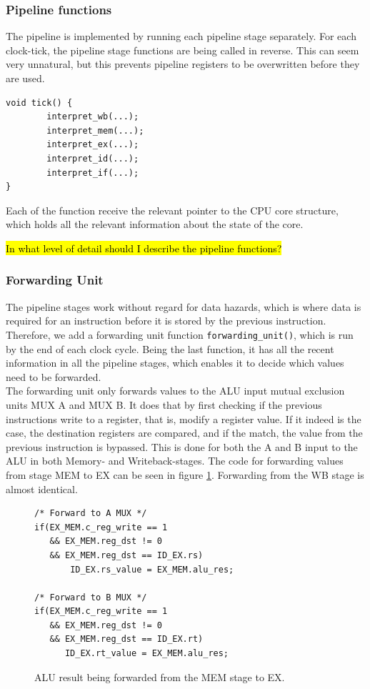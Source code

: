 \subsubsection{Pipeline functions}
The pipeline is implemented by running each pipeline stage separately. For each
clock-tick, the pipeline stage functions are being called in reverse. This can
seem very unnatural, but this prevents pipeline registers to be overwritten
before they are used.
\begin{verbatim}
void tick() {
        interpret_wb(...);
        interpret_mem(...);
        interpret_ex(...);
        interpret_id(...);
        interpret_if(...);
}
\end{verbatim}

Each of the function receive the relevant pointer to the CPU core structure,
which holds all the relevant information about the state of the core.

\hl{In what level of detail should I describe the pipeline functions?}


\subsubsection{Forwarding Unit}
The pipeline stages work without regard for data hazards, which is where data
is required for an instruction before it is stored by the previous instruction.
Therefore, we add a forwarding unit function \texttt{forwarding\_unit()}, which
is run by the end of each clock cycle. Being the last function, it has all the
recent information in all the pipeline stages, which enables it to decide which
values need to be forwarded.\\
The forwarding unit only forwards values to the ALU input mutual exclusion
units MUX A and MUX B. It does that by first checking if the previous
instructions write to a register, that is, modify a register value. If it
indeed is the case, the destination registers are compared, and if the match,
the value from the previous instruction is bypassed. This is done for both the
A and B input to the ALU in both Memory- and Writeback-stages. The code for
forwarding values from stage MEM to EX can be seen in figure
\ref{fig:forwarding_unit_code}. Forwarding from the WB stage is almost
identical.

\begin{figure}[H]
\centering
\begin{lstlisting}[style=customc]
/* Forward to A MUX */
if(EX_MEM.c_reg_write == 1
   && EX_MEM.reg_dst != 0
   && EX_MEM.reg_dst == ID_EX.rs)
       ID_EX.rs_value = EX_MEM.alu_res;

/* Forward to B MUX */
if(EX_MEM.c_reg_write == 1
   && EX_MEM.reg_dst != 0
   && EX_MEM.reg_dst == ID_EX.rt)
      ID_EX.rt_value = EX_MEM.alu_res;
\end{lstlisting}
\caption{ALU result being forwarded from the MEM stage to EX.}
\label{fig:forwarding_unit_code}
\end{figure}

